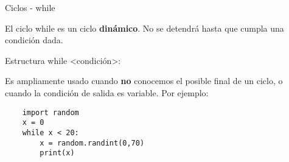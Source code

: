 \begin{frame}[fragile]{Ciclos - while}\vspace{10pt}

El ciclo while es un ciclo \textbf{din\'amico}. No se detendr\'a hasta que cumpla una condici\'on dada.

\begin{block}{Estructura}
	while <condici\'on>:
\end{block}

\vspace{5pt}

Es ampliamente usado cuando \textbf{no} conocemos el posible final de un ciclo, o cuando la condici\'on de salida es variable. Por ejemplo:

\begin{center}
\begin{lstlisting}
	import random
	x = 0
	while x < 20:
		x = random.randint(0,70)
		print(x)
\end{lstlisting}
\end{center}

\end{frame}